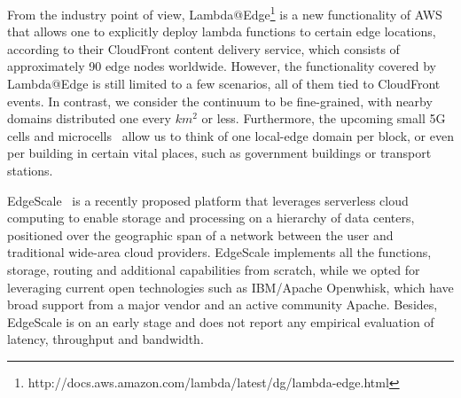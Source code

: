 



From the industry point of view, Lambda@Edge\footnote{http://docs.aws.amazon.com/lambda/latest/dg/lambda-edge.html} is a new functionality of AWS that allows one to explicitly deploy lambda functions to certain edge locations, according to their CloudFront content delivery service, which consists of approximately 90 edge nodes worldwide. However, the functionality covered by Lambda@Edge is still limited to a few scenarios, all of them tied to CloudFront events. In contrast, we consider the continuum to be fine-grained, with nearby domains distributed one every $km^2$ or less. Furthermore, the upcoming  small 5G cells and microcells~\cite{beck2014mobile} allow us to think of one local-edge domain per block, or even per building in certain vital places, such as government buildings or transport stations.

EdgeScale~\cite{Lara2016hierarchical} is a recently proposed platform that leverages serverless cloud computing to enable storage and processing on a hierarchy of data centers, positioned over the geographic span of a network between the user and traditional wide-area cloud providers. EdgeScale implements all the functions, storage, routing and additional capabilities from scratch, while we opted for leveraging current open technologies such as IBM/Apache Openwhisk, which have broad support from a major vendor and an active community Apache. Besides, EdgeScale is on an early stage and does not report any empirical evaluation of latency, throughput and bandwidth.

